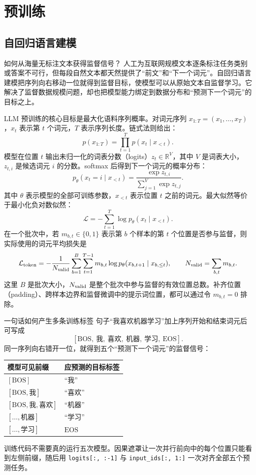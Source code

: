 \part{预训练}

\chapter{自回归语言建模}\label{sec:pretraining}

\begin{motivationbox}{如何从海量无标注文本获得监督信号？}
人工为互联网规模文本逐条标注任务类别或答案不可行，但每段自然文本都天然提供了“前文”和“下一个词元”。自回归语言建模把序列向右移动一位就得到监督目标，使模型可以从原始文本自监督学习。它解决了监督数据规模问题，却也把模型能力绑定到数据分布和“预测下一个词元”的目标之上。
\end{motivationbox}

LLM 预训练的核心目标是最大化语料序列概率。对词元序列 $x_{1:T}=(x_1,\ldots,x_T)$，$x_t$ 表示第 $t$ 个词元，$T$ 表示序列长度。链式法则给出：
\[
p(x_{1:T})=\prod_{t=1}^{T}p(x_t\mid x_{<t}).
\]
模型在位置 $t$ 输出未归一化的词表分数（logits）$z_t\in\mathbb R^V$，其中 $V$ 是词表大小，$z_{t,i}$ 是候选词元 $i$ 的分数。softmax 后得到下一个词元的概率分布：
\[
p_\theta(x_t=i\mid x_{<t})=\frac{\exp z_{t,i}}{\sum_{j=1}^{V}\exp z_{t,j}}.
\]
其中 $\theta$ 表示模型的全部可训练参数，$x_{<t}$ 表示位置 $t$ 之前的词元。最大似然等价于最小化负对数似然：
\[
\mathcal L=-\sum_{t=1}^{T}\log p_\theta(x_t\mid x_{<t}).
\]
在一个批次中，若 $m_{b,t}\in\{0,1\}$ 表示第 $b$ 个样本的第 $t$ 个位置是否参与监督，则实际使用的词元平均损失是
\[
\mathcal L_{\rm token}
=-\frac{1}{N_{\rm valid}}
\sum_{b=1}^{B}\sum_{t=1}^{T-1}
m_{b,t}\log p_\theta(x_{b,t+1}\mid x_{b,\le t}),
\qquad
N_{\rm valid}=\sum_{b,t}m_{b,t}.
\]
这里 $B$ 是批次大小，$N_{\rm valid}$ 是整个批次中参与监督的有效位置总数。补齐位置（padding）、跨样本边界和监督微调中的提示词位置，都可以通过令 $m_{b,t}=0$ 排除。

\begin{examplebox}{一句话如何产生多条训练标签}
句子“我喜欢机器学习”加上序列开始和结束词元后可写成
\[
[\mathrm{BOS},\ \text{我},\ \text{喜欢},\ \text{机器},\ \text{学习},\ \mathrm{EOS}].
\]
同一序列向右错开一位，就得到五个“预测下一个词元”的监督信号：

\begin{center}
\begin{tabular}{ll}
\toprule
模型可见前缀 & 应预测的目标标签\\
\midrule
$[\mathrm{BOS}]$ & “我”\\
$[\mathrm{BOS},\text{我}]$ & “喜欢”\\
$[\mathrm{BOS},\text{我},\text{喜欢}]$ & “机器”\\
$[\ldots,\text{机器}]$ & “学习”\\
$[\ldots,\text{学习}]$ & $\mathrm{EOS}$\\
\bottomrule
\end{tabular}
\end{center}

训练代码不需要真的运行五次模型。因果遮罩让一次并行前向中的每个位置只能看到左侧前缀，随后用 \texttt{logits[:, :-1]} 与 \texttt{input\_ids[:, 1:]} 一次对齐全部五个预测任务。
\end{examplebox}

